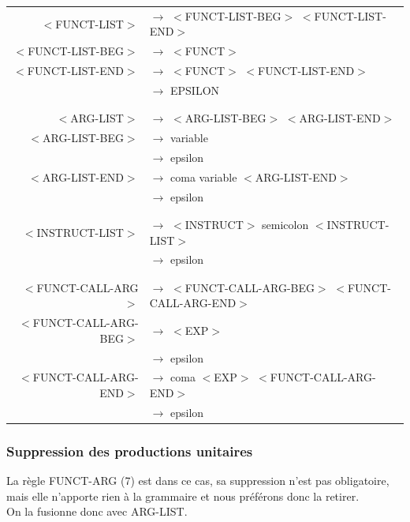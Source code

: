 \documentclass[a4paper,10pt]{article}
\begin{document}
	\begin{center}\begin{tabular}{rl}				
					
		$<$FUNCT-LIST$>$		& $\rightarrow$ $<$FUNCT-LIST-BEG$>$ $<$FUNCT-LIST-END$>$\\
		$<$FUNCT-LIST-BEG$>$	& $\rightarrow$ $<$FUNCT$>$ \\
		$<$FUNCT-LIST-END$>$	& $\rightarrow$ $<$FUNCT$>$ $<$FUNCT-LIST-END$>$\\
								& $\rightarrow$ EPSILON \\
								&\\
								&\\

		$<$ARG-LIST$>$			& $\rightarrow$ $<$ARG-LIST-BEG$>$ $<$ARG-LIST-END$>$\\ 
		$<$ARG-LIST-BEG$>$		& $\rightarrow$ variable\\ 
								& $\rightarrow$ epsilon \\
		$<$ARG-LIST-END$>$		& $\rightarrow$ coma variable $<$ARG-LIST-END$>$\\ 
								& $\rightarrow$ epsilon \\
								&\\
								&\\
		$<$INSTRUCT-LIST$>$		& $\rightarrow$ $<$INSTRUCT$>$ semicolon $<$INSTRUCT-LIST$>$\\
								& $\rightarrow$ epsilon\\
								&\\
								&\\

		$<$FUNCT-CALL-ARG$>$	& $\rightarrow$ $<$FUNCT-CALL-ARG-BEG$>$ $<$FUNCT-CALL-ARG-END$>$\\ 
		$<$FUNCT-CALL-ARG-BEG$>$& $\rightarrow$ $<$EXP$>$\\ 
								& $\rightarrow$ epsilon \\
		$<$FUNCT-CALL-ARG-END$>$& $\rightarrow$ coma $<$EXP$>$ $<$FUNCT-CALL-ARG-END$>$\\ 
								& $\rightarrow$ epsilon \\
	\end{tabular}\end{center}

\subsubsection{Suppression des productions unitaires}
	La règle FUNCT-ARG (7) est dans ce cas, sa suppression n'est pas obligatoire, mais elle n'apporte rien à la grammaire et nous préférons donc la retirer.\\
	On la fusionne donc avec ARG-LIST.\\
\end{document}
